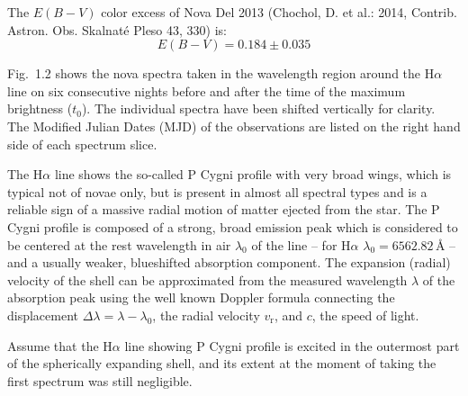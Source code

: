 The $E(B-V)$ color excess of Nova Del 2013 (Chochol, D. et al.: 2014,
Contrib. Astron. Obs. Skalnat\'e Pleso 43, 330) is:
\[ E(B-V) = 0.184 \pm 0.035 \]

Fig.~1.2 shows the nova spectra taken in the wavelength region around the
H$\alpha$ line on six consecutive nights before and after the time of the
maximum brightness ($t_0$). The individual spectra have been shifted
vertically for clarity. The Modified Julian Dates (MJD) of the observations
are listed on the right hand side of each spectrum slice.

The H$\alpha$ line shows the so-called P Cygni profile with very broad wings,
which is typical not of novae only, but is present in almost all spectral
types and is a reliable sign of a massive radial motion of matter ejected
from the star. The P Cygni profile is composed of a strong, broad emission
peak which is considered to be centered at the rest wavelength in air
$\lambda_0$ of the line -- for H$\alpha$ $\lambda_0 = 6562.82$\,\AA{} -- and
a usually weaker, blueshifted absorption component. The expansion (radial)
velocity of the shell can be approximated from the measured wavelength
$\lambda$ of the absorption peak using the well known Doppler formula
connecting the displacement $\Delta\lambda = \lambda - \lambda_0$, the
radial velocity $v_{\mathrm{r}}$, and $c$, the speed of light.

Assume that the H$\alpha$ line showing P Cygni profile is excited in the
outermost part of the spherically expanding shell, and its extent at the
moment of taking the first spectrum was still negligible.

